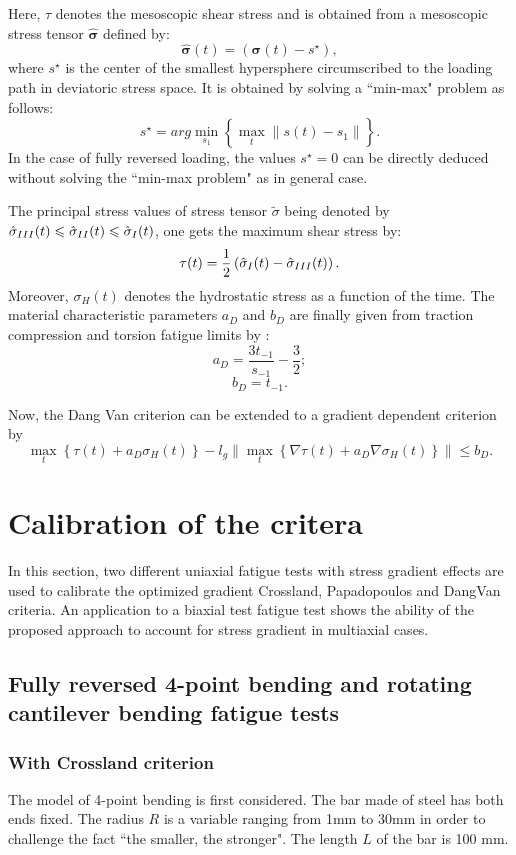 Here, $\tau$ denotes the mesoscopic shear stress and is obtained from a mesoscopic stress tensor $\hat{\bm{\sigma}}$ defined by:
$$\hat{\bm{\sigma}}(t)=(\bm{\sigma}(t)-s^\star),$$
where $s^\star$ is the center of the smallest hypersphere circumscribed to the loading path in deviatoric stress space. It is obtained by solving a ``min-max" problem as follows:
$$s^\star = arg \min\limits_{s_1}\left\{\max\limits_t\parallel s(t)-s_1\parallel\right\}.$$
In the case of fully reversed loading, the values $s^\star=0$ can be directly deduced without solving the ``min-max problem" as in general case.

The principal stress values of stress tensor $\widetilde{\sigma}$ being denoted  by $\hat{\sigma}_{\Rmnum{3}}(t)\leqslant\hat{\sigma}_{\Rmnum{2}}(t)\leqslant\hat{\sigma}_{\Rmnum{1}}(t)$, one gets the maximum shear stress by:
$$\tau(t)=\dfrac{1}{2}\left( \hat{\sigma}_{\Rmnum{1}}(t)-\hat{\sigma}_{\Rmnum{3}}(t)\right) .$$
Moreover, $\sigma_H(t)$ denotes  the hydrostatic stress as a function of the time.
The material characteristic parameters $a_D$ and $b_D$ are finally  given from traction compression and torsion fatigue limits by  :
$$a_D=\dfrac{3t_{-1}}{s_{-1}}-\dfrac{3}{2};$$  $$b_D=t_{-1}.$$

Now,  the Dang Van criterion can be extended to a gradient dependent criterion by 
\begin{equation}
	\max \limits_{t}\left\{\tau{(t)}+a_D\sigma_H(t)\right\}-l_g\parallel	\max \limits_{t}\left\{{\nabla\tau{(t)}}+a_D\nabla\sigma_H(t)\right\}\parallel\leqslant b_D.
	\label{modified dangvan}
\end{equation}
\section{Calibration of the critera}

In this section, two different uniaxial fatigue tests with stress gradient effects are used to calibrate the optimized gradient Crossland, Papadopoulos and DangVan criteria. An application to a biaxial test fatigue test shows the ability of the proposed approach to account for stress gradient in multiaxial cases. 


\subsection{Fully reversed 4-point bending and rotating cantilever bending fatigue tests}
\subsubsection{With Crossland criterion}
The model of 4-point bending is first considered. The bar made of steel has both ends fixed. The radius $R$ is a variable ranging from 1mm to 30mm in order to  challenge the fact ``the smaller, the stronger". The length $L$ of the bar is 100 mm.

